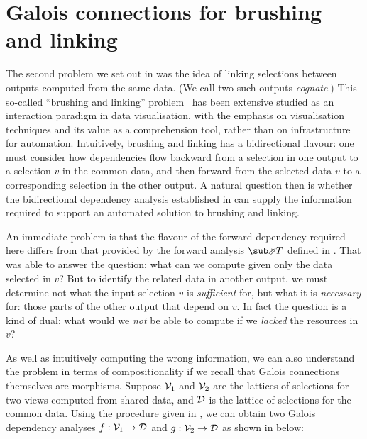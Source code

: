 \section{Galois connections for brushing and linking}
\label{sec:toolkit}

The second problem we set out in  was the idea of linking selections between outputs computed from the same data. (We call two such outputs \emph{cognate}.) This so-called ``brushing and linking'' problem~\cite{becker87} has been extensive studied as an interaction paradigm in data visualisation, with the emphasis on visualisation techniques and its value as a comprehension tool, rather than on infrastructure for automation. Intuitively, brushing and linking has a bidirectional flavour: one must consider how dependencies flow backward from a selection in one output to a selection $v$ in the common data, and then forward from the selected data $v$ to a corresponding selection in the other output. A natural question then is whether the bidirectional dependency analysis established in  can supply the information required to support an automated solution to brushing and linking.

An immediate problem is that the flavour of the forward dependency required here differs from that provided by the forward analysis $\evalFwdF{T}$ defined in . That was able to answer the question: what can we compute given only the data selected in $v$? But to identify the related data in another output, we must determine not what the input selection $v$ is \emph{sufficient} for, but what it is \emph{necessary} for: those parts of the other output that depend on $v$. In fact the question is a kind of dual: what would we \emph{not} be able to compute if we \emph{lacked} the resources in $v$?

As well as intuitively computing the wrong information, we can also understand the problem in terms of compositionality if we recall that Galois connections themselves are morphisms. Suppose $\mathcal{V}_1$ and $\mathcal{V}_2$ are the lattices of selections for two views computed from shared data, and $\mathcal{D}$ is the lattice of selections for the common data. Using the procedure given in , we can obtain two Galois dependency analyses $f: \mathcal{V}_1 \to \mathcal{D}$ and $g: \mathcal{V}_2 \to \mathcal{D}$ as shown in  below:




